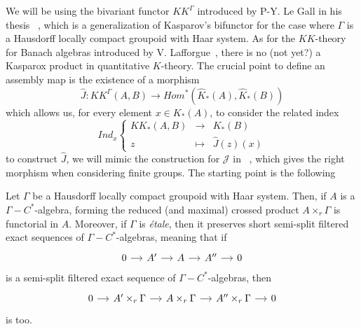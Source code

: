 We will be using the bivariant functor $KK^\Gamma$ introduced by P-Y. Le Gall in his thesis ~\cite{LeGall}, which is a generalization of Kasparov's bifunctor for the case where $\Gamma$ is a Hausdorff locally compact groupoid with Haar system. As for the $KK$-theory for Banach algebras introduced by V. Lafforgue~\cite{Lafforgue}, there is no (not yet?) a Kasparox product in quantitative $K$-theory. The crucial point to define an assembly map is the existence of a morphism 
\[\hat J : KK^{\Gamma}(A,B)\rightarrow Hom^*(\hat K_*(A),\hat K_*(B))\]
which allows us, for every element $x\in K_*(A)$, to consider the related index
\[Ind_x \left\{ \begin{array}{ccc} KK_*(A,B) & \rightarrow  & K_*(B)\\
	z & \mapsto & \hat J(z)(x)
\end{array}\right.\]
to construct $\hat J$, we will mimic the construction for $\mathcal J$ in ~\cite{OY2}, which gives the right morphism when considering finite groups. The starting point is the following 

\begin{lem}
Let $\Gamma$ be a Hausdorff locally compact groupoid with Haar system. Then, if $A$ is a $\Gamma-C^*$-algebra, forming the reduced (and maximal) crossed product $A\times_r \Gamma$ is functorial in $A$. Moreover, if $\Gamma$ is \textit{étale}, then it preserves short semi-split filtered exact sequences of $\Gamma-C^*$-algebras, meaning that if 
\[\begin{tikzcd}[column sep = small] 0\arrow{r} & A' \arrow{r} & A\arrow{r} & A'' \arrow{r} & 0\end{tikzcd}\]
is a semi-split filtered exact sequence of $\Gamma-C^*$-algebras, then 
\[\begin{tikzcd}[column sep = small] 0\arrow{r} & A' \times_r \Gamma\arrow{r} & A\times_r \Gamma\arrow{r} & A'' \times_r \Gamma\arrow{r} & 0\end{tikzcd}\]
is too.
\end{lem}

